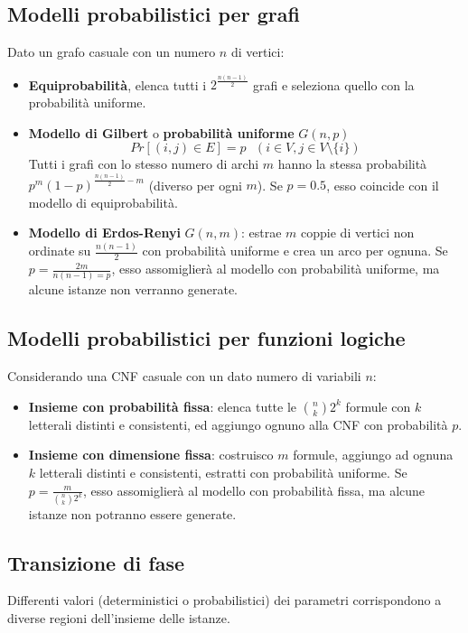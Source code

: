 \documentclass{article}
\begin{document}
\subsection{Modelli probabilistici per grafi}
Dato un grafo casuale con un numero $n$ di vertici:
\begin{itemize}
    \item \textbf{Equiprobabilità}, elenca tutti i $2^{\frac{n(n-1)}{2}}$ grafi
          e seleziona quello con la probabilità uniforme.
    \item \textbf{Modello di Gilbert} o \textbf{probabilità uniforme} $G(n,p)$
          $$Pr[(i,j)\in E]=p\text{   }(i\in V,j\in V\setminus\{i\})$$
          Tutti i grafi con lo stesso numero di archi $m$ hanno la stessa probabilità
          $p^m(1-p)^{\frac{n(n-1)}{2}-m}$ (diverso per ogni $m$). Se $p=0.5$, esso
          coincide con il modello di equiprobabilità.

    \item \textbf{Modello di Erdos-Renyi} $G(n,m)$: estrae $m$ coppie di
          vertici non ordinate su $\frac{n(n-1)}{2}$ con probabilità uniforme e
          crea un arco per ognuna. Se $p=\frac{2m}{n(n-1)=p}$, esso assomiglierà
          al modello con probabilità uniforme, ma alcune istanze non verranno generate.
\end{itemize}

\subsection{Modelli probabilistici per funzioni logiche}
Considerando una CNF casuale con un dato numero di variabili $n$:
\begin{itemize}
    \item \textbf{Insieme con probabilità fissa}: elenca tutte le
          $\binom{n}{k}2^k$ formule con $k$ letterali distinti e consistenti, ed
          aggiungo ognuno alla CNF con probabilità $p$.
    \item \textbf{Insieme con dimensione fissa}: costruisco $m$ formule,
          aggiungo ad ognuna $k$ letterali distinti e consistenti, estratti con
          probabilità uniforme. Se $p=\frac{m}{\binom{n}{k}2^k}$, esso assomiglierà
          al modello con probabilità fissa, ma alcune istanze non potranno essere generate.
\end{itemize}

\subsection{Transizione di fase}
Differenti valori (deterministici o probabilistici) dei parametri corrispondono
a diverse regioni dell'insieme delle istanze.
\end{document}
